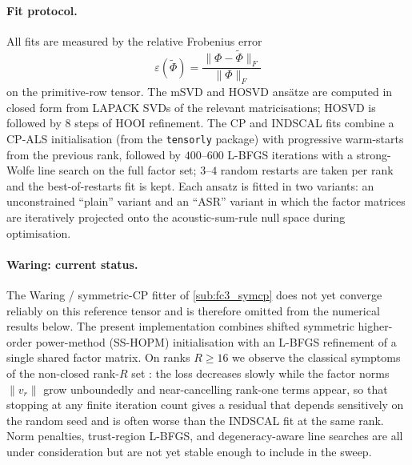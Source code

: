 \paragraph{Fit protocol.} All fits are measured by the relative Frobenius error
\begin{equation}\label{eq:fc3_rel_err}
  \varepsilon(\tilde\Phi)
  = \frac{\|\Phi - \tilde\Phi\|_F}{\|\Phi\|_F}
\end{equation}
on the primitive-row tensor. The mSVD and HOSVD ans\"atze are computed in closed form from
LAPACK SVDs of the relevant matricisations; HOSVD is followed by $8$ steps of HOOI refinement.
The CP and INDSCAL fits combine a CP-ALS initialisation (from the \texttt{tensorly} package) with
progressive warm-starts from the previous rank, followed by $400$--$600$ L-BFGS iterations with
a strong-Wolfe line search on the full factor set; $3$--$4$ random restarts are taken per rank
and the best-of-restarts fit is kept. Each ansatz is fitted in two variants: an unconstrained
``plain'' variant and an ``ASR'' variant in which the factor matrices are iteratively projected
onto the acoustic-sum-rule null space during optimisation.

\paragraph{Waring: current status.} The Waring / symmetric-CP fitter of
\cref{sub:fc3_symcp} does not yet converge reliably on this reference tensor and is therefore
omitted from the numerical results below. The present implementation combines shifted
symmetric higher-order power-method (SS-HOPM) initialisation \cite{kolda_shifted_2011} with an
L-BFGS refinement of a single shared factor matrix. On ranks $R\ge 16$ we observe the
classical symptoms of the non-closed rank-$R$ set \cite{stegeman_degeneracy_2006,
de_silva_tensor_2008}: the loss decreases slowly while the factor norms $\|v_r\|$ grow
unboundedly and near-cancelling rank-one terms appear, so that stopping at any finite
iteration count gives a residual that depends sensitively on the random seed and is often
worse than the INDSCAL fit at the same rank. Norm penalties, trust-region L-BFGS, and
degeneracy-aware line searches \cite{stegeman_degeneracy_2006, kolda_numerical_2015} are all
under consideration but are not yet stable enough to include in the sweep.

